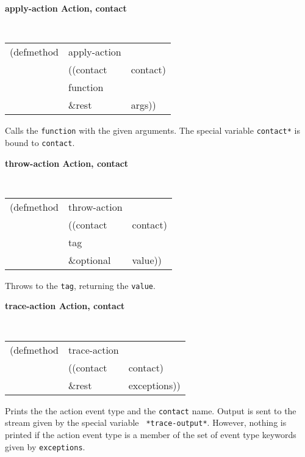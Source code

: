 {\samepage
{\large {\bf apply-action \hfill Action, contact}}
\begin{flushright} 
\parbox[t]{6.125in}{
\tt
\begin{tabular}{lll}
\raggedright
(defmethod & apply-action & \\
& ((contact  &contact)\\
& function \\
& \&rest & args))
\end{tabular}
\rm
}\end{flushright}}
\begin{flushright} 
\parbox[t]{6.125in}{
Calls the {\tt function} with the given arguments.
The special variable {\tt *contact*}
is bound to {\tt contact}.
}\end{flushright}


{\samepage
{\large {\bf throw-action \hfill Action, contact}}
\begin{flushright} 
\parbox[t]{6.125in}{
\tt
\begin{tabular}{lll}
\raggedright
(defmethod & throw-action & \\
& ((contact  &contact)\\
&  tag\\
& \&optional &  value))
\end{tabular}
\rm
}\end{flushright}}
\begin{flushright} 
\parbox[t]{6.125in}{
Throws to the {\tt tag}, returning the {\tt value}.}\end{flushright}

{\samepage
{\large {\bf trace-action \hfill Action, contact}}
\begin{flushright} 
\parbox[t]{6.125in}{
\tt
\begin{tabular}{lll}
\raggedright
(defmethod & trace-action & \\
& ((contact  &contact)\\
& \&rest & exceptions))
\end{tabular}
\rm
}\end{flushright}}
\begin{flushright} 
\parbox[t]{6.125in}{
Prints the the action event type and the {\tt contact} name. Output is sent
to the stream given by the special variable {\tt
*trace-output*}.
However, nothing is printed if the action event type is a member
of the set of  event type
keywords given by {\tt exceptions}.}\end{flushright}

